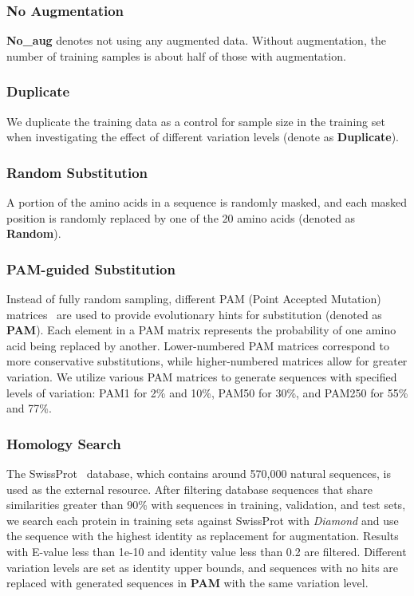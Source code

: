 \documentclass{article}
\begin{document}
\subsubsection{No Augmentation}
\textbf{No\_aug} denotes not using any augmented data. Without augmentation, the number of training samples is about half of those with augmentation.

\subsubsection{Duplicate}
We duplicate the training data as a control for sample size in the training set when investigating the effect of different variation levels (denote as \textbf{Duplicate}).

\subsubsection{Random Substitution}
A portion of the amino acids in a sequence is randomly masked, and each masked position is randomly replaced by one of the 20 amino acids (denoted as \textbf{Random}).

\subsubsection{PAM-guided Substitution}
Instead of fully random sampling, different PAM (Point Accepted Mutation) matrices~\cite{dayhoff1978pam} are used to provide evolutionary hints for substitution (denoted as \textbf{PAM}). Each element in a PAM matrix represents the probability of one amino acid being replaced by another. Lower-numbered PAM matrices correspond to more conservative substitutions, while higher-numbered matrices allow for greater variation. We utilize various PAM matrices to generate sequences with specified levels of variation: PAM1 for 2\% and 10\%, PAM50 for 30\%, and PAM250 for 55\% and 77\%.

\subsubsection{Homology Search}
The SwissProt~\cite{uniprot2023} database, which contains around 570,000 natural sequences, is used as the external resource. After filtering database sequences that share similarities greater than 90\% with sequences in training, validation, and test sets, we search each protein in training sets against SwissProt with \textit{Diamond} and use the sequence with the highest identity as replacement for augmentation. Results with E-value less than 1e-10 and identity value less than 0.2 are filtered. Different variation levels are set as identity upper bounds, and sequences with no hits are replaced with generated sequences in \textbf{PAM} with the same variation level.
\end{document}
